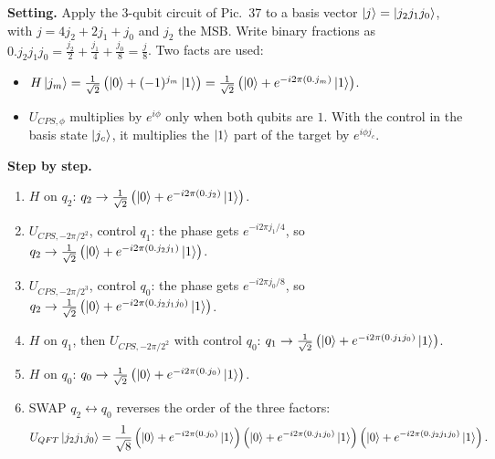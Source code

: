 \documentclass[a4paper, 10pt]{article}
\begin{document}
\begin{solution}
	\noindent \textbf{Setting.} Apply the 3-qubit circuit of Pic.~37 to a basis vector \( \ket{j} = \ket{j_2j_1j_0} \), with \( j = 4j_2 + 2j_1 + j_0 \) and \( j_2 \) the MSB. Write binary fractions as \( 0.j_2j_1j_0 = \tfrac{j_2}{2} + \tfrac{j_1}{4} + \tfrac{j_0}{8} = \tfrac{j}{8} \).
	Two facts are used:
	\begin{itemize}
		\item \( H\ket{j_m} = \tfrac{1}{\sqrt{2}}\left(\ket{0} + (-1)^{j_m}\ket{1}\right) = \tfrac{1}{\sqrt{2}}\left(\ket{0} + e^{-i2\pi(0.j_m)}\ket{1}\right) \).
		\item \( U_{CPS, \phi} \) multiplies by \( e^{i\phi} \) only when both qubits are \( 1 \). With the control in the basis state \( \ket{j_c} \), it multiplies the \( \ket{1} \) part of the target by \( e^{i\phi j_c} \).
	\end{itemize}

	\myspace

	\noindent \textbf{Step by step.}
	\begin{enumerate}
		\item \( H \) on \( q_2 \): \( q_2 \to \tfrac{1}{\sqrt{2}}\left(\ket{0} + e^{-i2\pi(0.j_2)}\ket{1}\right) \).
		\item \( U_{CPS, -2\pi/2^2} \), control \( q_1 \): the phase gets \( e^{-i2\pi j_1/4} \), so \( q_2 \to \tfrac{1}{\sqrt{2}}\left(\ket{0} + e^{-i2\pi(0.j_2j_1)}\ket{1}\right) \).
		\item \( U_{CPS, -2\pi/2^3} \), control \( q_0 \): the phase gets \( e^{-i2\pi j_0/8} \), so \( q_2 \to \tfrac{1}{\sqrt{2}}\left(\ket{0} + e^{-i2\pi(0.j_2j_1j_0)}\ket{1}\right) \).
		\item \( H \) on \( q_1 \), then \( U_{CPS, -2\pi/2^2} \) with control \( q_0 \): \( q_1 \to \tfrac{1}{\sqrt{2}}\left(\ket{0} + e^{-i2\pi(0.j_1j_0)}\ket{1}\right) \).
		\item \( H \) on \( q_0 \): \( q_0 \to \tfrac{1}{\sqrt{2}}\left(\ket{0} + e^{-i2\pi(0.j_0)}\ket{1}\right) \).
		\item SWAP \( q_2 \leftrightarrow q_0 \) reverses the order of the three factors:
		      \[
			      U_{QFT}\ket{j_2j_1j_0} = \frac{1}{\sqrt{8}}\left(\ket{0} + e^{-i2\pi(0.j_0)}\ket{1}\right)\left(\ket{0} + e^{-i2\pi(0.j_1j_0)}\ket{1}\right)\left(\ket{0} + e^{-i2\pi(0.j_2j_1j_0)}\ket{1}\right).
		      \]
	\end{enumerate}

	\myspace


\end{solution}
\end{document}
